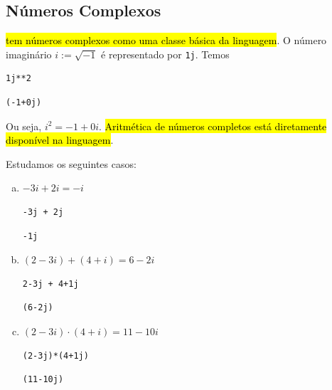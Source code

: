 \subsection{Números Complexos}

\hl{{\python} tem números complexos como uma classe básica da linguagem}. O número imaginário $i := \sqrt{-1}$ é representado por \texttt{1j}. Temos

\begin{lstlisting}
1j**2
\end{lstlisting}

\begin{verbatim}
(-1+0j)
\end{verbatim}

Ou seja, $i^2 = -1 + 0i$. \hl{Aritmética de números completos está diretamente disponível na linguagem}.

\begin{ex}
  Estudamos os seguintes casos:
  \begin{enumerate}[a)]
  \item $-3i + 2i = -i$

\begin{lstlisting}[framexrightmargin=-1.5em]
-3j + 2j
\end{lstlisting}

\begin{verbatim}
-1j
\end{verbatim}

  \item $(2 - 3i) + (4 + i) = 6 -2i$

\begin{lstlisting}[framexrightmargin=-1.5em]
2-3j + 4+1j
\end{lstlisting}

\begin{verbatim}
(6-2j)
\end{verbatim}

  \item $(2 - 3i)\cdot (4 + i) = 11 - 10i$

\begin{lstlisting}[framexrightmargin=-1.5em]
(2-3j)*(4+1j)
\end{lstlisting}

\begin{verbatim}
(11-10j)
\end{verbatim}

\end{enumerate}

\end{ex}

